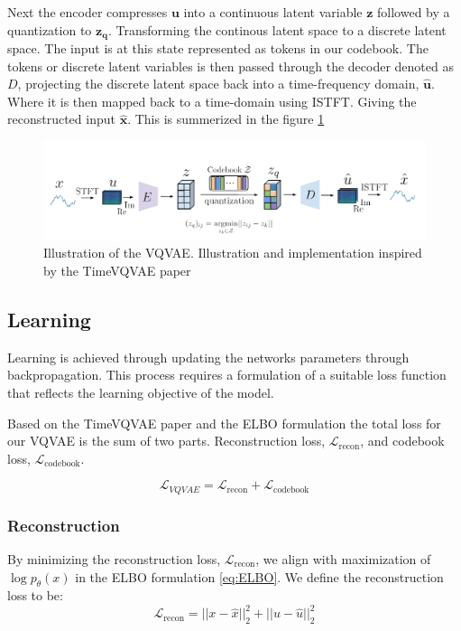 Next the encoder compresses $\mathbf{u}$ into a continuous latent variable $\mathbf{z}$ followed by a quantization to $\mathbf{z_q}$. Transforming the continous latent space to a discrete latent space. The input is at this state represented as tokens in our codebook.
The tokens or discrete latent variables is then passed through the decoder denoted as $D$, projecting the discrete latent space back into a time-frequency domain, $\hat{\mathbf{u}}$. Where it is then mapped back to a time-domain using ISTFT.
Giving the reconstructed input $\mathbf{\hat{x}}$. This is summerized in the figure \ref{fig:VQVAE}

\begin{center}
\begin{figure}[H]
    \includegraphics[scale=0.8]{figures/figure-pdf/VQVAE.pdf}
    \caption{ Illustration of the VQVAE. Illustration and implementation inspired by the TimeVQVAE paper\cite{lee2023masked} }
    \label{fig:VQVAE}
\end{figure}
\end{center}

\subsection{Learning}
Learning is achieved through updating the networks parameters through backpropagation. This process requires a formulation of a suitable loss function that reflects the learning objective of the model.

Based on the TimeVQVAE\cite{lee2023masked} paper and the ELBO formulation the total loss for our VQVAE is the sum of two parts. Reconstruction loss, $\mathcal{L}_{\text{recon}}$, and codebook loss, $\mathcal{L}_\text{codebook}$.

\begin{equation}
    \mathcal{L}_{VQVAE} = \mathcal{L}_\text{recon} + \mathcal{L}_\text{codebook}
    \label{eq:VQVAEloss}
\end{equation}

\subsubsection{Reconstruction}
By minimizing the reconstruction loss, $\mathcal{L}_{\text{recon}}$, we align with maximization of $\log p_\theta(x)$ in the ELBO formulation \ref{eq:ELBO}.
We define the reconstruction loss to be:
\begin{equation}
    \mathcal{L}_{\text{recon}} = ||x-\hat{x}||_2^2 + ||u-\hat{u}||_2^2
\end{equation}

